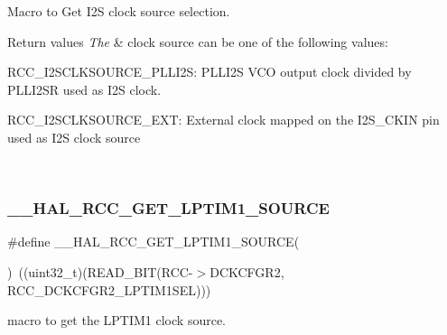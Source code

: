 Macro to Get I2S clock source selection. 


\begin{DoxyRetVals}{Return values}
{\em The} & clock source can be one of the following values\+: \begin{DoxyItemize}
\item R\+C\+C\+\_\+\+I2\+S\+C\+L\+K\+S\+O\+U\+R\+C\+E\+\_\+\+P\+L\+L\+I2S\+: P\+L\+L\+I2S V\+CO output clock divided by P\+L\+L\+I2\+SR used as I2S clock. \item R\+C\+C\+\_\+\+I2\+S\+C\+L\+K\+S\+O\+U\+R\+C\+E\+\_\+\+E\+XT\+: External clock mapped on the I2\+S\+\_\+\+C\+K\+IN pin used as I2S clock source \end{DoxyItemize}
\\
\hline
\end{DoxyRetVals}
\mbox{\label{group___r_c_c_ex___exported___macros_gad6688c07a2a8c314df547de8caf378bb}} 
\subsubsection{\texorpdfstring{\_\_HAL\_RCC\_GET\_LPTIM1\_SOURCE}{\_\_HAL\_RCC\_GET\_LPTIM1\_SOURCE}}
{\footnotesize\ttfamily \#define \+\_\+\+\_\+\+H\+A\+L\+\_\+\+R\+C\+C\+\_\+\+G\+E\+T\+\_\+\+L\+P\+T\+I\+M1\+\_\+\+S\+O\+U\+R\+CE(\begin{DoxyParamCaption}{ }\end{DoxyParamCaption})~((uint32\+\_\+t)(R\+E\+A\+D\+\_\+\+B\+IT(R\+CC-\/$>$D\+C\+K\+C\+F\+G\+R2, R\+C\+C\+\_\+\+D\+C\+K\+C\+F\+G\+R2\+\_\+\+L\+P\+T\+I\+M1\+S\+EL)))}



macro to get the L\+P\+T\+I\+M1 clock source. 


